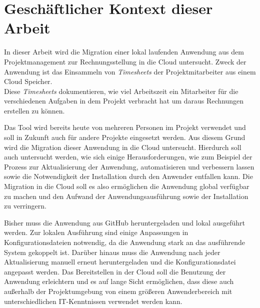 \section{Geschäftlicher Kontext dieser Arbeit}

In dieser Arbeit wird die Migration einer lokal laufenden Anwendung aus dem Projektmanagement zur Rechnungsstellung in die Cloud untersucht. Zweck der Anwendung ist das Einsammeln von \textit{\glspl{Timesheet}} der Projektmitarbeiter aus einem Cloud Speicher. \\Diese \textit{\glspl{Timesheet}} dokumentieren, wie viel Arbeitszeit ein Mitarbeiter für die verschiedenen Aufgaben in dem Projekt verbracht hat um daraus Rechnungen erstellen zu können.

Das Tool wird bereits heute von mehreren Personen im Projekt verwendet und soll in Zukunft auch für andere Projekte eingesetzt werden. Aus diesem Grund wird die Migration dieser Anwendung in die Cloud untersucht.
Hierdurch soll auch untersucht werden, wie sich einige Herausforderungen, wie zum Beispiel der Prozess zur Aktualisierung der Anwendung, automatisieren und verbessern lassen sowie die Notwendigkeit der Installation durch den Anwender entfallen kann. Die Migration in die Cloud soll es also ermöglichen die Anwendung global verfügbar zu machen und den Aufwand der Anwendungsausführung sowie der Installation zu verringern.

Bisher muss die Anwendung aus GitHub heruntergeladen und lokal ausgeführt werden. Zur lokalen Ausführung sind einige Anpassungen in Konfigurationsdateien notwendig, da die Anwendung stark an das ausführende System gekoppelt ist. Darüber hinaus muss die Anwendung nach jeder Aktualisierung manuell erneut heruntergeladen und die Konfigurationsdatei angepasst werden. Das Bereitstellen in der Cloud soll die Benutzung der Anwendung erleichtern und es auf lange Sicht ermöglichen, dass diese auch außerhalb der Projektumgebung von einem größeren Anwenderbereich mit unterschiedlichen IT-Kenntnissen verwendet werden kann.